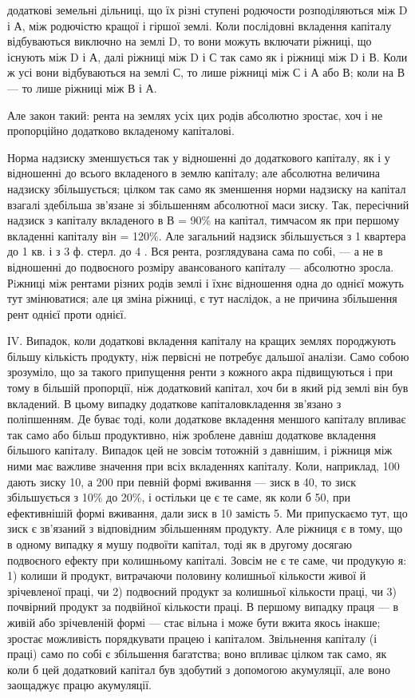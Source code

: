 \parcont{}  %
додаткові земельні дільниці, що їх різні ступені родючости розподіляються між
D і А, між родючістю кращої і гіршої землі. Коли послідовні вкладення капіталу
відбуваються виключно на землі D, то вони можуть включати ріжниці, що
існують між D і А, далі ріжниці між D і С так само як і ріжниці між D і В.
Коли ж усі вони відбуваються на землі С, то лише ріжниці між С і А або В;
коли на В — то лише ріжниці між В і А.

Але закон такий: рента на землях усіх цих родів абсолютно зростає, хоч
і не пропорційно додатково вкладеному капіталові.

Норма надзиску зменшується так у відношенні до додаткового капіталу,
як і у відношенні до всього вкладеного в землю капіталу; але абсолютна величина
надзиску збільшується; цілком так само як зменшення норми надзиску
на капітал взагалі здебільша зв’язане зі збільшенням абсолютної маси зиску.
Так, пересічний надзиск з капіталу вкладеного в В = 90\% на капітал, тимчасом
як при першому вкладенні капіталу він = 120\%. Але загальний надзиск
збільшується з 1 квартера до 1 кв. і з 3 ф. стерл. до 4 . Вся рента,
розглядувана сама по собі, — а не в відношенні до подвоєного розміру авансованого
капіталу — абсолютно зросла. Рiжниці між рентами різних родів землі і
їхнє відношення одна до однієї можуть тут змінюватися; але ця зміна ріжниці,
є тут наслідок, а не причина збільшення рент однієї проти однієї.

ІV. Випадок, коли додаткові вкладення капіталу на кращих землях породжують
більшу кількість продукту, ніж первісні не потребує дальшої аналізи.
Само собою зрозуміло, що за такого припущення ренти з кожного
акра підвищуються і при тому в більшій пропорції, ніж додатковий капітал,
хоч би в який рід землі він був вкладений. В цьому випадку додаткове
капіталовкладення зв’язано з поліпшенням. Де буває тоді, коли додаткове
вкладення меншого капіталу впливає так само або більш продуктивно, ніж зроблене
давніш додаткове вкладення більшого капіталу. Випадок цей не зовсім тотожній
з давнішим, і ріжниця між ними має важливе значення при всіх
вкладеннях капіталу. Коли, наприклад, 100 дають зиску 10, а 200 при певній
формі вживання — зиск в 40, то зиск збільшується з 10\% до 20\%, і остільки
це є те саме, як коли б 50, при ефективнішій формі вживання, дали зиск в 10
замість 5. Ми припускаємо тут, що зиск є зв’язаний з відповідним збільшенням
продукту. Але ріжниця є в тому, що в одному випадку я мушу подвоїти капітал,
тоді як в другому досягаю подвоєного ефекту при колишньому капіталі.
Зовсім не є те саме, чи продукую я: 1) колиши й продукт, витрачаючи половину
колишньої кількости живої й зрічевленої праці, чи 2) подвоєний продукт
за колишньої кількости праці, чи 3) почвірний продукт за подвійної кількости
праці. В першому випадку праця — в живій або зрічевленій формі — стає вільна
і може бути вжита якось інакше; зростає можливість порядкувати працею
і капіталом. Звільнення капіталу (і праці) само по собі є збільшення багатства;
воно впливає цілком так само, як коли б цей додатковий капітал був здобутий
з допомогою акумуляції, але воно заощаджує працю акумуляції.

